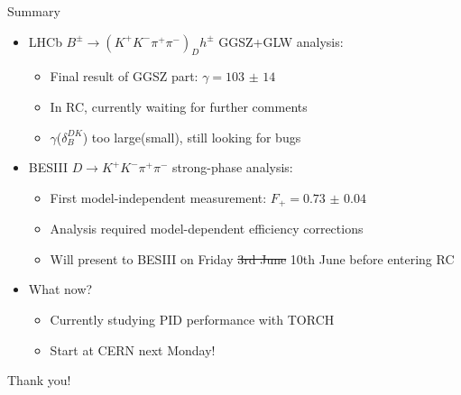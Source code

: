 \documentclass{beamer}
\begin{document}
\begin{frame}{Summary}
  \begin{itemize}
    \setlength\itemsep{1.0em}
    \item{LHCb $B^\pm\to(K^+K^-\pi^+\pi^-)_Dh^\pm$ GGSZ+GLW analysis:}
    \begin{itemize}
      \setlength\itemsep{0.0em}
      \item{Final result of GGSZ part: $\gamma = \SI{103(14)}{}$}
      \item{In RC, currently waiting for further comments}
      \item{$\gamma$($\delta_B^{DK}$) too large(small), still looking for bugs}
    \end{itemize}
    \item{BESIII $D\to K^+K^-\pi^+\pi^-$ strong-phase analysis:}
    \begin{itemize}
      \setlength\itemsep{0.0em}
      \item{First model-independent measurement: $F_+ = \SI{0.73(4)}{}$}
      \item{Analysis required model-dependent efficiency corrections}
      \item{Will present to BESIII on Friday \sout{3rd June} 10th June before entering RC}
    \end{itemize}
    \item{What now?}
    \begin{itemize}
      \item{Currently studying PID performance with TORCH}
      \item{Start at CERN next Monday!}
    \end{itemize}
  \end{itemize}
  \begin{center}
    \huge Thank you!
  \end{center}
\end{frame}
\end{document}
